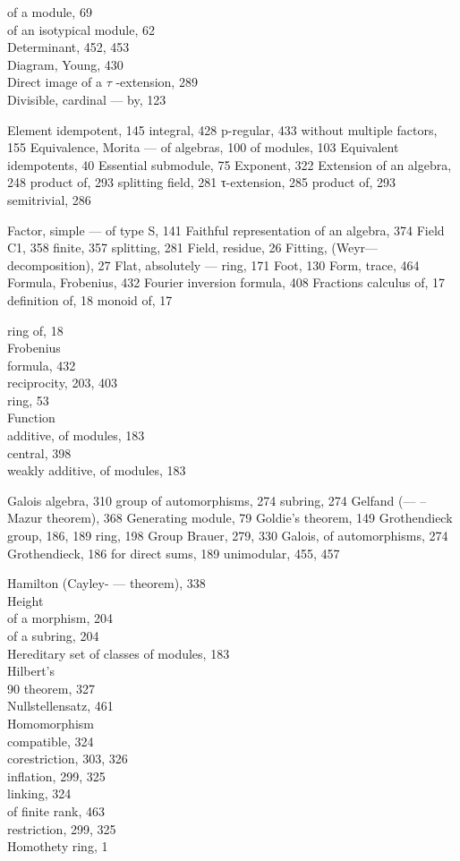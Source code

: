 of a module, 69\\
of an isotypical module, 62\\
Determinant, 452, 453\\
Diagram, Young, 430\\
Direct image of a \(\tau\) -extension, 289\\
Divisible, cardinal --- by, 123


Element idempotent, 145 integral, 428 p-regular, 433 without multiple factors, 155 Equivalence, Morita --- of algebras, 100 of modules, 103 Equivalent idempotents, 40 Essential submodule, 75 Exponent, 322 Extension of an algebra, 248 product of, 293 splitting field, 281 τ-extension, 285 product of, 293 semitrivial, 286


Factor, simple --- of type S, 141 Faithful representation of an algebra, 374 Field C1, 358 finite, 357 splitting, 281 Field, residue, 26 Fitting, (Weyr--- decomposition), 27 Flat, absolutely --- ring, 171 Foot, 130 Form, trace, 464 Formula, Frobenius, 432 Fourier inversion formula, 408 Fractions calculus of, 17 definition of, 18 monoid of, 17

ring of, 18\\
Frobenius\\
formula, 432\\
reciprocity, 203, 403\\
ring, 53\\
Function\\
additive, of modules, 183\\
central, 398\\
weakly additive, of modules, 183


Galois algebra, 310 group of automorphisms, 274 subring, 274 Gelfand (--- --Mazur theorem), 368 Generating module, 79 Goldie's theorem, 149 Grothendieck group, 186, 189 ring, 198 Group Brauer, 279, 330 Galois, of automorphisms, 274 Grothendieck, 186 for direct sums, 189 unimodular, 455, 457


Hamilton (Cayley- --- theorem), 338\\
Height\\
of a morphism, 204\\
of a subring, 204\\
Hereditary set of classes of modules, 183\\
Hilbert's\\
90 theorem, 327\\
Nullstellensatz, 461\\
Homomorphism\\
compatible, 324\\
corestriction, 303, 326\\
inflation, 299, 325\\
linking, 324\\
of finite rank, 463\\
restriction, 299, 325\\
Homothety ring, 1

